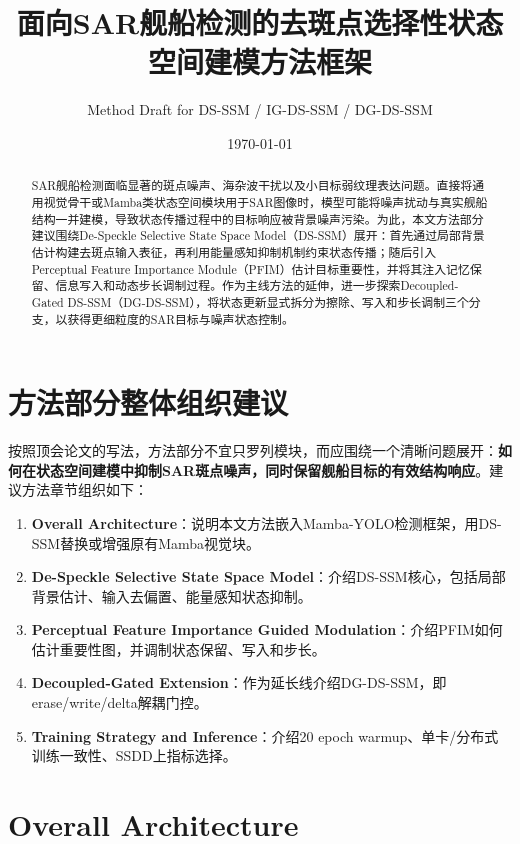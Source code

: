\documentclass[UTF8,zihao=-4]{ctexart}
\title{\textbf{面向SAR舰船检测的去斑点选择性状态空间建模方法框架}}
\author{Method Draft for DS-SSM / IG-DS-SSM / DG-DS-SSM}
\date{\today}
\begin{document}
\maketitle

\begin{abstract}
SAR舰船检测面临显著的斑点噪声、海杂波干扰以及小目标弱纹理表达问题。直接将通用视觉骨干或Mamba类状态空间模块用于SAR图像时，模型可能将噪声扰动与真实舰船结构一并建模，导致状态传播过程中的目标响应被背景噪声污染。为此，本文方法部分建议围绕De-Speckle Selective State Space Model（DS-SSM）展开：首先通过局部背景估计构建去斑点输入表征，再利用能量感知抑制机制约束状态传播；随后引入Perceptual Feature Importance Module（PFIM）估计目标重要性，并将其注入记忆保留、信息写入和动态步长调制过程。作为主线方法的延伸，进一步探索Decoupled-Gated DS-SSM（DG-DS-SSM），将状态更新显式拆分为擦除、写入和步长调制三个分支，以获得更细粒度的SAR目标与噪声状态控制。
\end{abstract}

\tableofcontents
\newpage

\section{方法部分整体组织建议}

按照顶会论文的写法，方法部分不宜只罗列模块，而应围绕一个清晰问题展开：\textbf{如何在状态空间建模中抑制SAR斑点噪声，同时保留舰船目标的有效结构响应}。建议方法章节组织如下：

\begin{enumerate}
  \item \textbf{Overall Architecture}：说明本文方法嵌入Mamba-YOLO检测框架，用DS-SSM替换或增强原有Mamba视觉块。
  \item \textbf{De-Speckle Selective State Space Model}：介绍DS-SSM核心，包括局部背景估计、输入去偏置、能量感知状态抑制。
  \item \textbf{Perceptual Feature Importance Guided Modulation}：介绍PFIM如何估计重要性图，并调制状态保留、写入和步长。
  \item \textbf{Decoupled-Gated Extension}：作为延长线介绍DG-DS-SSM，即erase/write/delta解耦门控。
  \item \textbf{Training Strategy and Inference}：介绍20 epoch warmup、单卡/分布式训练一致性、SSDD上指标选择。
\end{enumerate}

\section{Overall Architecture}
\end{document}
